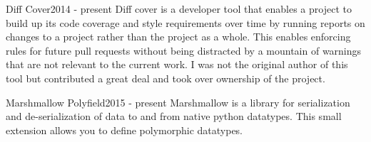 %
%
%


\begin{projects}
	\project
	{Diff Cover}{2014 - present}
	{}
	{Diff cover is a developer tool that enables a project to build up its code coverage and style requirements over time by running reports on changes to a project rather than the project as a whole. This enables enforcing rules for future pull requests without being distracted by a mountain of warnings that are not relevant to the current work. I was not the original author of this tool but contributed a great deal and took over ownership of the project.}
	{}
				
	\project
	{Marshmallow Polyfield}{2015 - present}
	{}
	{Marshmallow is a library for serialization and de-serialization of data to and from native python datatypes. This small extension allows you to define polymorphic datatypes. }
	{}

\end{projects}